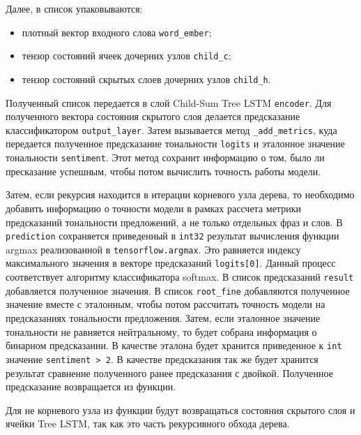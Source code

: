 Далее, в список упаковываются:
\begin{itemize}
\item плотный вектор входного слова \texttt{word\_ember};
\item тензор состояний ячеек дочерних узлов \texttt{child\_c};
\item тензор состояний скрытых слоев дочерних узлов \texttt{child\_h}.
\end{itemize}

Полученный список передается в слой Child-Sum Tree LSTM \texttt{encoder}. Для полученного вектора состояния скрытого слоя делается предсказание классификатором \texttt{output\_layer}. Затем вызывается метод \texttt{\_add\_metrics}, куда передается полученное предсказание тональности \texttt{logits} и эталонное значение тональности \texttt{sentiment}. Этот метод сохранит информацию о том, было ли пресказание успешным, чтобы потом вычислить точность работы модели.

Затем, если рекурсия находится в итерации корневого узла дерева, то необходимо добавить информацию о точности модели в рамках рассчета метрики предсказаний тональности предложений, а не только отдельных фраз и слов. В \texttt{prediction} сохраняется приведенный в \texttt{int32} результат вычисления функции argmax реализованной в \texttt{tensorflow.argmax}. Это равняется индексу максимального значения в векторе предсказаний \texttt{logits[0]}. Данный процесс соответствует алгоритму классификатора softmax. В список предсказаний \texttt{result} добавляется полученное значения. В список \texttt{root\_fine} добавляются полученное значение вместе с эталонным, чтобы потом рассчитать точность модели на предсказаниях тональности предложения. Затем, если эталонное значение тональности не равняется нейтральному, то будет собрана информация о бинарном предсказании. В качестве эталона будет хранится приведенное к \texttt{int} значение \texttt{sentiment > 2}. В качестве предсказания так же будет хранится результат сравнение полученного ранее предсказания с двойкой. Полученное предсказание возвращается из функции.

Для не корневого узла из функции будут возвращаться состояния скрытого слоя и ячейки Tree LSTM, так как это часть рекурсивного обхода дерева.

